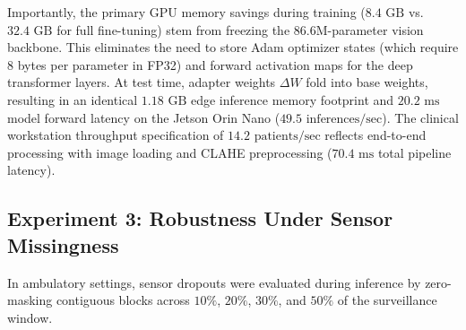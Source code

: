 \documentclass[a4paper,fleqn]{cas-dc}
\begin{document}
\begin{table}[t]
\centering
\caption{Experiment 2: Compute Profiling and Memory Allocation. Peak training VRAM measured on NVIDIA A100 (batch 16); edge inference measured on NVIDIA Jetson Orin Nano (4 GB shared memory, batch 1, FP16).}
\label{tab:exp2_efficiency}
\end{table}

Importantly, the primary GPU memory savings during training ($8.4\text{ GB}$ vs. $32.4\text{ GB}$ for full fine-tuning) stem from freezing the 86.6M-parameter vision backbone. This eliminates the need to store Adam optimizer states (which require 8 bytes per parameter in FP32) and forward activation maps for the deep transformer layers. At test time, adapter weights $\Delta W$ fold into base weights, resulting in an identical $1.18\text{ GB}$ edge inference memory footprint and $20.2\text{ ms}$ model forward latency on the Jetson Orin Nano ($49.5\text{ inferences/sec}$). The clinical workstation throughput specification of $14.2\text{ patients/sec}$ reflects end-to-end processing with image loading and CLAHE preprocessing ($70.4\text{ ms}$ total pipeline latency).

\subsection{Experiment 3: Robustness Under Sensor Missingness}
In ambulatory settings, sensor dropouts were evaluated during inference by zero-masking contiguous blocks across $10\%$, $20\%$, $30\%$, and $50\%$ of the surveillance window.
\end{document}
